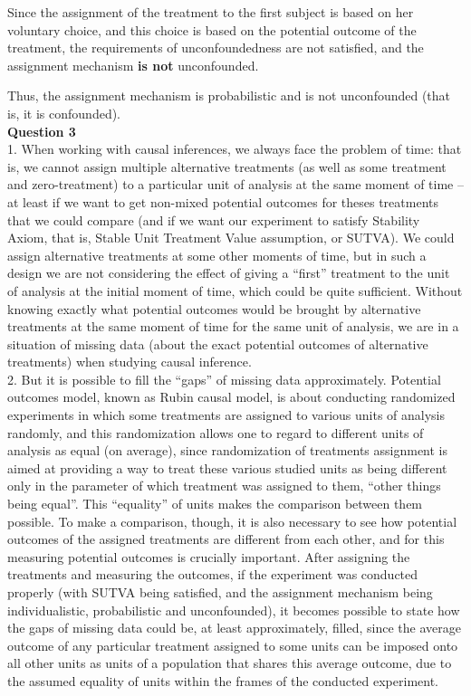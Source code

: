 \documentclass{article}
\begin{document}
Since the assignment of the treatment to the first subject is based on her voluntary choice, and this choice is based on the potential outcome of the treatment, the requirements of unconfoundedness are not satisfied, and the assignment mechanism \textbf{is not} unconfounded.

Thus, the assignment mechanism is probabilistic and is not unconfounded (that is, it is confounded).
\\

\textbf{Question 3}
\\

1. When working with causal inferences, we always face the problem of time: that is, we cannot assign multiple alternative treatments (as well as some treatment and zero-treatment) to a particular unit of analysis at the same moment of time – at least if we want to get non-mixed potential outcomes for theses treatments that we could compare (and if we want our experiment to satisfy Stability Axiom, that is, Stable Unit Treatment Value assumption, or SUTVA). We could assign alternative treatments at some other moments of time, but in such a design we are not considering the effect of giving a “first” treatment to the unit of analysis at the initial moment of time, which could be quite sufficient. Without knowing exactly what potential outcomes would be brought by alternative treatments at the same moment of time for the same unit of analysis, we are in a situation of missing data (about the exact potential outcomes of alternative treatments) when studying causal inference. 
\\

2. But it is possible to fill the “gaps” of missing data approximately. Potential outcomes model, known as Rubin causal model, is about conducting randomized experiments in which some treatments are assigned to various units of analysis randomly, and this randomization allows one to regard to different units of analysis as equal (on average), since randomization of treatments assignment is aimed at providing a way to treat these various studied units as being different only in the parameter of which treatment was assigned to them, “other things being equal”. This “equality” of units makes the comparison between them possible. To make a comparison, though, it is also necessary to see how potential outcomes of the assigned treatments are different from each other, and for this measuring potential outcomes is crucially important. After assigning the treatments and measuring the outcomes, if the experiment was conducted properly (with SUTVA being satisfied, and the assignment mechanism being individualistic, probabilistic and unconfounded), it becomes possible to state how the gaps of missing data could be, at least approximately, filled, since the average outcome of any particular treatment assigned to some units can be imposed onto all other units as units of a population that shares this average outcome, due to the assumed equality of units within the frames of the conducted experiment.   
\\
\end{document}
